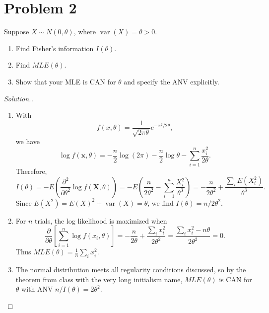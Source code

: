 \documentclass{article}
\renewcommand{\vec}[1]{\mathbf{#1}}
\begin{document}
\newpage
\section*{Problem 2}
Suppose $X\sim N(0,\theta)$, where $\operatorname{var}(X) = \theta > 0$.
\begin{enumerate}
\item Find Fisher's information $I(\theta)$.
\item Find $MLE(\theta)$.
\item Show that your MLE is CAN for $\theta$ and specify the ANV explicitly.
\end{enumerate}

\begin{proof}[Solution.]
\begin{enumerate}
\item With
\begin{equation*}
f(x,\theta) = \frac{1}{\sqrt{2\pi\theta}}e^{-x^2/2\theta},
\end{equation*}
we have
\begin{equation*}
\log f(\vec{x},\theta) = -\frac{n}{2}\log(2\pi) - \frac{n}{2}\log\theta - \sum_{i = 1}^n\frac{x_i^2}{2\theta}.
\end{equation*}
Therefore,
\begin{equation*}
I(\theta) = -E\left(\frac{\partial^2}{\partial\theta^2}\log f(\vec{X},\theta)\right) = -E\left(\frac{n}{2\theta^2} - \sum_{i = 1}^n\frac{X_i^2}{\theta^3}\right) = -\frac{n}{2\theta^2} + \frac{\sum_i E(X_i^2)}{\theta^3}.
\end{equation*}
Since $E(X^2) = E(X)^2 + \operatorname{var}(X) = \theta$, we find $I(\theta) = n/2\theta^2$.
\item For $n$ trials, the log likelihood is maximized when
\begin{equation*}
\frac{\partial}{\partial\theta}\left[\sum_{i = 1}^n\log f(x_i,\theta)\right] = -\frac{n}{2\theta} + \frac{\sum_i x_i^2}{2\theta^2} = \frac{\sum_i x_i^2 - n\theta}{2\theta^2} = 0.
\end{equation*}
Thus $MLE(\theta) = \frac{1}{n}\sum_i x_i^2$.
\item The normal distribution meets all regularity conditions discussed, so by the theorem from class with the very long initialism name, $MLE(\theta)$ is CAN for $\theta$ with ANV $n/I(\theta) = 2\theta^2$.
\end{enumerate}
\end{proof}


\newpage
\end{document}
